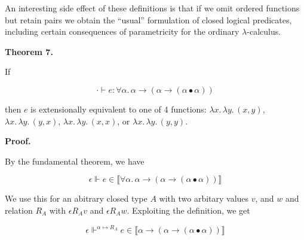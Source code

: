 \documentclass[10pt,a4paper]{amsart}
\begin{document}

 
An interesting side effect of these definitions is that if we omit ordered functions but retain pairs we obtain the “usual” formulation of closed logical predicates, including certain consequences of parametricity for the ordinary $\lambda$-calculus.\par
 
 
 
\par\medskip\noindent\textbf{Theorem 7.}\par
 
 
If\par
  
\par  \quad  \[\cdot\vdash e:\forall\alpha.\,\alpha\mathbin{\rightarrow}(\alpha\mathbin{\rightarrow}(\alpha\bullet\alpha))\]\quad  \quad  
  
then $e$ is extensionally equivalent to one of 4 functions: $\lambda x.\,\lambda y.\,(x,y)$, $\lambda x.\,\lambda y.\,(y,x)$, $\lambda x.\,\lambda y.\,(x,x)$, or $\lambda x.\,\lambda y.\,(y,y)$.\par
 
 
 
 
 
\par\medskip\noindent\textbf{Proof.}\par
 
 
By the fundamental theorem, we have\par
  
\par  \quad  \[\epsilon\Vdash e\in\llbracket\forall\alpha.\,\alpha\mathbin{\rightarrow}(\alpha\mathbin{\rightarrow}(\alpha\bullet\alpha))\rrbracket\]\quad  \quad  
  
We use this for an abitrary closed type $A$ with two arbitary values $v$, and $w$ and relation $R_{A}$ with $\epsilon\mathrel{R_{A}}v$ and $\epsilon\mathrel{R_{A}}w$. Exploiting the definition, we get\par
  
\par  \quad  \[\epsilon\Vdash^{\alpha\mapsto R_{A}}e\in\llbracket\alpha\mathbin{\rightarrow}(\alpha\mathbin{\rightarrow}(\alpha\bullet\alpha))\rrbracket\]\quad  \quad  
  
\end{document}
